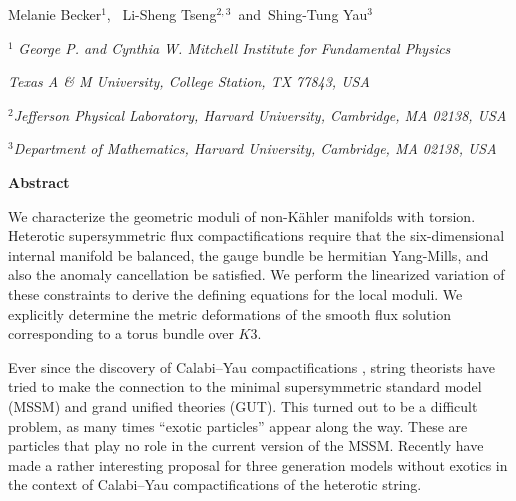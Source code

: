 \centerline{Melanie Becker$^{1}$, ~Li-Sheng
Tseng$^{2,3}$~and~Shing-Tung Yau$^3$}
\bigskip
\bigskip
\centerline{$^1$ \it George P. and Cynthia W. Mitchell Institute
for Fundamental Physics} \centerline{\it Texas A \& M University,
College Station, TX 77843, USA}
\smallskip
\centerline{$^2$\it Jefferson Physical Laboratory, Harvard University,
Cambridge, MA 02138, USA}
\smallskip
\centerline{$^3$\it Department of Mathematics, Harvard University,
Cambridge, MA 02138, USA}

\bigskip

\bigskip

\bigskip

\centerline{\bf Abstract}

\bigskip
We characterize the geometric moduli of non-K\"ahler manifolds
with torsion.  Heterotic supersymmetric flux compactifications
require that the six-dimensional internal manifold be balanced,
the gauge bundle be hermitian Yang-Mills, and also the anomaly
cancellation be satisfied. We perform the linearized variation of
these constraints to derive the defining equations for the local
moduli. We explicitly determine the metric deformations of the
smooth flux solution corresponding to a torus bundle over $K3$.





\bigskip
\baselineskip 18pt
\bigskip
\noindent


Ever since the discovery of Calabi--Yau compactifications \caho,
string theorists have tried to make the connection to the minimal
supersymmetric standard model (MSSM) and grand unified theories
(GUT). This turned out to be a difficult problem, as many times
``exotic particles'' appear along the way. These are particles
that play no role in the current version of the MSSM.
Recently  have made a rather interesting
proposal for three generation models without exotics in the
context of Calabi--Yau compactifications of the heterotic
string.


